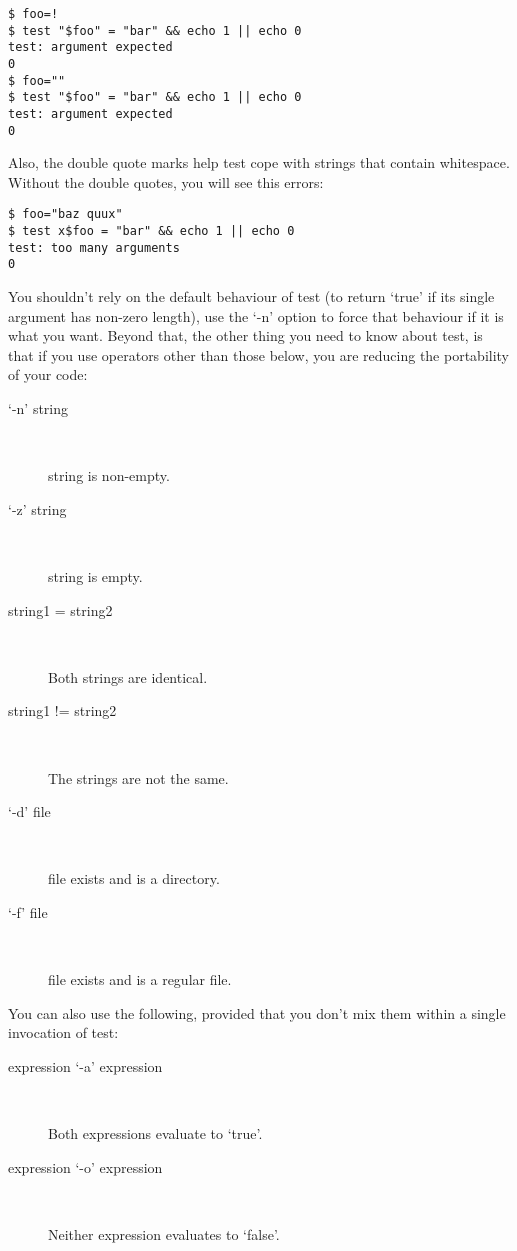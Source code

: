 \begin{Verbatim}[frame=single]
$ foo=!
$ test "$foo" = "bar" && echo 1 || echo 0
test: argument expected
0
$ foo=""
$ test "$foo" = "bar" && echo 1 || echo 0
test: argument expected
0
\end{Verbatim}

Also, the double quote marks help test cope with strings that contain whitespace. Without the double quotes, you will see this errors:

\begin{Verbatim}[frame=single]
$ foo="baz quux"
$ test x$foo = "bar" && echo 1 || echo 0
test: too many arguments
0
\end{Verbatim}

You shouldn't rely on the default behaviour of test (to return `true' if its single argument has non-zero length), use the `-n' option to force that behaviour if it is what you want. Beyond that, the other thing you need to know about test, is that if you use operators other than those below, you are reducing the portability of your code:

\begin{description}
\item[`-n' string]
\

    string is non-empty. 
\item[`-z' string]
\

    string is empty. 
\item[string1 = string2]
\

    Both strings are identical. 
\item[string1 != string2]
\

    The strings are not the same. 
\item[`-d' file]
\

    file exists and is a directory. 
\item[`-f' file]
\

    file exists and is a regular file. 
\end{description}

You can also use the following, provided that you don't mix them within a single invocation of test:

\begin{description}
\item[expression `-a' expression]
\

    Both expressions evaluate to `true'. 
\item[expression `-o' expression]
\

    Neither expression evaluates to `false'. 
\end{description}

